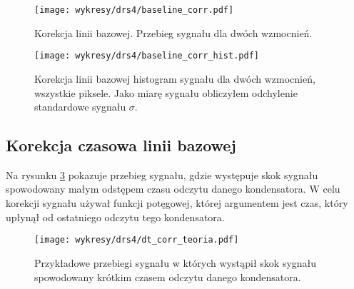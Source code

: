\documentclass[a4paper,11pt,twoside]{article}
\begin{document}
\begin{figure}[H] 
\centering
\texttt{[image: wykresy/drs4/baseline\_corr.pdf]}
\caption{Korekcja linii bazowej. Przebieg sygnału dla dwóch wzmocnień.}
\label{fig:baseline_corr}
\end{figure}

\begin{figure}[H] 
\centering
\texttt{[image: wykresy/drs4/baseline\_corr\_hist.pdf]}
\caption{Korekcja linii bazowej histogram sygnału dla dwóch wzmocnień, wszystkie piksele. Jako miarę sygnału obliczyłem odchylenie standardowe sygnału $\sigma$.}
\label{fig:baseline_corr_hist}
\end{figure}

\newpage
\subsection{Korekcja czasowa linii bazowej}
Na rysunku \ref{fig:dt_corr_Waveform} pokazuje przebieg sygnału, gdzie występuje skok sygnału spowodowany małym odstępem czasu odczytu danego kondensatora. W celu korekcji sygnału używał funkcji potęgowej, której argumentem jest czas, który upłynął od ostatniego odczytu tego kondensatora.  
\begin{figure}[H] 
\centering
\texttt{[image: wykresy/drs4/dt\_corr\_teoria.pdf]}
\caption{Przykładowe przebiegi sygnału w których wystąpił skok sygnału spowodowany krótkim czasem odczytu danego kondensatora.}
\label{fig:dt_corr_Waveform}
\end{figure}
\end{document}
